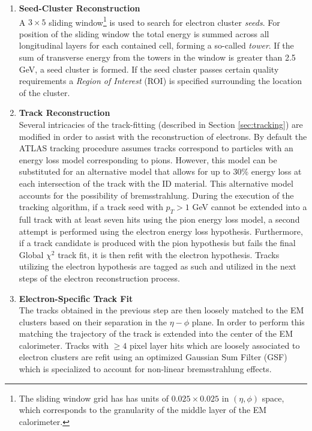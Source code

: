 \begin{enumerate}
    \item \textbf{Seed-Cluster Reconstruction}\\
        A $3 \times 5$ sliding window\footnote{The sliding window grid has has units of $0.025 \times 0.025$ in $(\eta, \phi)$ space, which corresponds to the granularity of the middle layer of the EM calorimeter.} is used to search for electron cluster \textit{seeds}.
        For position of the sliding window the total energy is summed across all longitudinal layers for each contained cell, forming a so-called \textit{tower}.
        If the sum of transverse energy from the towers in the window is greater than 2.5 GeV, a seed cluster is formed.
        If the seed cluster passes certain quality requirements a \textit{Region of Interest} (ROI) is specified surrounding the location of the cluster.
    \item \textbf{Track Reconstruction}\\
        Several intricacies of the track-fitting (described in Section \ref{sec:tracking}) are modified in order to assist with the reconstruction of electrons.
        By default the ATLAS tracking procedure assumes tracks correspond to particles with an energy loss model corresponding to pions.
        However, this model can be substituted for an alternative model that allows for up to 30\% energy loss at each intersection of the track with the ID material.
        This alternative model accounts for the possibility of bremsstrahlung.
        During the execution of the tracking algorithm, if a track seed with $p_T > 1$ GeV cannot be extended into a full track with at least seven hits using the pion energy loss model, a second attempt is performed using the electron energy loss hypothesis.
        Furthermore, if a track candidate is produced with the pion hypothesis but fails the final Global $\chi^2$ track fit, it is then refit with the electron hypothesis.
        Tracks utilizing the electron hypothesis are tagged as such and utilized in the next steps of the electron reconstruction process.
    \item \textbf{Electron-Specific Track Fit}\\
        The tracks obtained in the previous step are then loosely matched to the EM clusters based on their separation in the $\eta-\phi$ plane.
        In order to perform this matching the trajectory of the track is extended into the center of the EM calorimeter.
        Tracks with $\geq 4$ pixel layer hits which are loosely associated to electron clusters are refit using an optimized Gaussian Sum Filter (GSF) \cite{ATLAS-CONF-2012-047} which is specialized to account for non-linear bremsstrahlung effects.

\end{enumerate}
